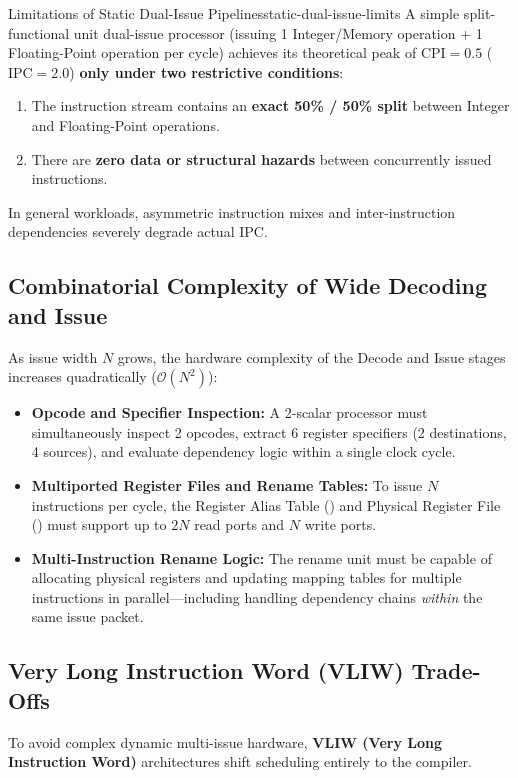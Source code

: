 \begin{observation}{Limitations of Static Dual-Issue Pipelines}{static-dual-issue-limits}
A simple split-functional unit dual-issue processor (issuing 1 Integer/Memory operation + 1 Floating-Point operation per cycle) achieves its theoretical peak of $\text{CPI} = 0.5$ ($\text{IPC} = 2.0$) \textbf{only under two restrictive conditions}:
\begin{enumerate}
    \item The instruction stream contains an \textbf{exact 50\% / 50\% split} between Integer and Floating-Point operations.
    \item There are \textbf{zero data or structural hazards} between concurrently issued instructions.
\end{enumerate}
In general workloads, asymmetric instruction mixes and inter-instruction dependencies severely degrade actual IPC.
\end{observation}

\subsection{Combinatorial Complexity of Wide Decoding and Issue}
As issue width $N$ grows, the hardware complexity of the Decode and Issue stages increases quadratically ($\mathcal{O}(N^2)$):
\begin{itemize}
    \item \textbf{Opcode and Specifier Inspection:} A 2-scalar processor must simultaneously inspect 2 opcodes, extract 6 register specifiers (2 destinations, 4 sources), and evaluate dependency logic within a single clock cycle.
    \item \textbf{Multiported Register Files and Rename Tables:} To issue $N$ instructions per cycle, the Register Alias Table () and Physical Register File () must support up to $2N$ read ports and $N$ write ports.
    \item \textbf{Multi-Instruction Rename Logic:} The rename unit must be capable of allocating physical registers and updating mapping tables for multiple instructions in parallel—including handling dependency chains \textit{within} the same issue packet.
\end{itemize}

\subsection{Very Long Instruction Word (VLIW) Trade-Offs}
To avoid complex dynamic multi-issue hardware, \textbf{VLIW (Very Long Instruction Word)} architectures shift scheduling entirely to the compiler.

